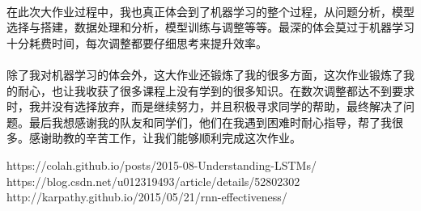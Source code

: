 \documentclass[UTF8]{ctexart}
\begin{document}
\paragraph{}在此次大作业过程中，我也真正体会到了机器学习的整个过程，从问题分析，模型选择与搭建，数据处理和分析，模型训练与调整等等。最深的体会莫过于机器学习十分耗费时间，每次调整都要仔细思考来提升效率。
\paragraph{}除了我对机器学习的体会外，这大作业还锻炼了我的很多方面，这次作业锻炼了我的耐心，也让我收获了很多课程上没有学到的很多知识。在数次调整都达不到要求时，我并没有选择放弃，而是继续努力，并且积极寻求同学的帮助，最终解决了问题。最后我想感谢我的队友和同学们，他们在我遇到困难时耐心指导，帮了我很多。感谢助教的辛苦工作，让我们能够顺利完成这次作业。

\begin{thebibliography}{3}
    https://colah.github.io/posts/2015-08-Understanding-LSTMs/
    https://blog.csdn.net/u012319493/article/details/52802302
    http://karpathy.github.io/2015/05/21/rnn-effectiveness/
    
\end{thebibliography}
\end{document}
